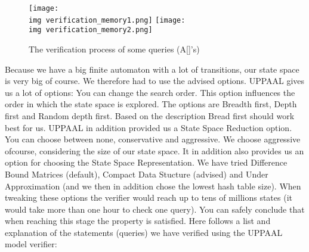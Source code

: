 \begin{figure}[ht]
  \centering
  \texttt{[image: \\img verification\_memory1.png]}
  \texttt{[image: \\img verification\_memory2.png]}
  \caption{The verification process of some queries (A[]'s)}
\end{figure}

Because we have a big finite automaton with a lot of transitions, our state space is very big of course. We therefore had to use the advised options. UPPAAL gives us a lot of options: You can change the search order. This option influences the order in which the state space is explored. The options are Breadth first, Depth first and Random depth first. Based on the description Bread first should work best for us. UPPAAL in addition provided us a State Space Reduction option. You can choose between none, conservative and aggressive. We choose aggressive ofcourse, considering the size of our state space. It in addition also provides us an option for choosing the State Space Representation. We have tried Difference Bound Matrices (default), Compact Data Stucture (advised) and Under Approximation (and we then in addition chose the lowest hash table size). When tweaking these options the verifier would reach up to tens of millions states (it would take more than one hour to check one query). You can safely conclude that when reaching this stage the property is satisfied. Here follows a list and explanation of the statements (queries) we have verified using the UPPAAL model verifier:

